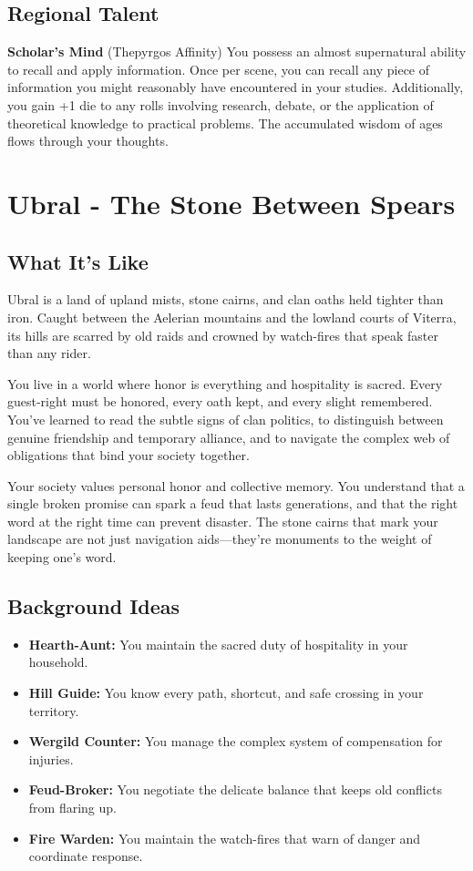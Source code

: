 \documentclass[11pt]{article}
\newcommand{\region}[1]{\section*{#1}}
\newcommand{\subregion}[1]{\subsection*{#1}}
\begin{document}
\begin{multicols}{2}
\subregion{Regional Talent}

\textbf{Scholar's Mind} (Thepyrgos Affinity)
You possess an almost supernatural ability to recall and apply information. Once per scene, you can recall any piece of information you might reasonably have encountered in your studies. Additionally, you gain +1 die to any rolls involving research, debate, or the application of theoretical knowledge to practical problems. The accumulated wisdom of ages flows through your thoughts.

\end{multicols}

\region{Ubral - The Stone Between Spears}

\begin{multicols}{2}
\subregion{What It's Like}

Ubral is a land of upland mists, stone cairns, and clan oaths held tighter than iron. Caught between the Aelerian mountains and the lowland courts of Viterra, its hills are scarred by old raids and crowned by watch-fires that speak faster than any rider.

You live in a world where honor is everything and hospitality is sacred. Every guest-right must be honored, every oath kept, and every slight remembered. You've learned to read the subtle signs of clan politics, to distinguish between genuine friendship and temporary alliance, and to navigate the complex web of obligations that bind your society together.

Your society values personal honor and collective memory. You understand that a single broken promise can spark a feud that lasts generations, and that the right word at the right time can prevent disaster. The stone cairns that mark your landscape are not just navigation aids—they're monuments to the weight of keeping one's word.

\columnbreak

\subregion{Background Ideas}

\begin{itemize}[leftmargin=*]
    \item \textbf{Hearth-Aunt:} You maintain the sacred duty of hospitality in your household.
    \item \textbf{Hill Guide:} You know every path, shortcut, and safe crossing in your territory.
    \item \textbf{Wergild Counter:} You manage the complex system of compensation for injuries.
    \item \textbf{Feud-Broker:} You negotiate the delicate balance that keeps old conflicts from flaring up.
    \item \textbf{Fire Warden:} You maintain the watch-fires that warn of danger and coordinate response.
\end{itemize}


\end{multicols}
\end{document}

